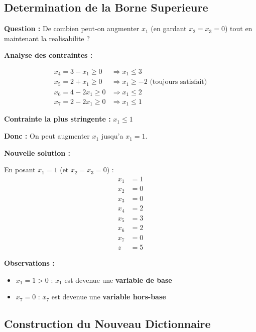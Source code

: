 \documentclass[12pt,a4paper]{article}
\begin{document}
\newpage
\subsection{Determination de la Borne Superieure}

\begin{methode}
\textbf{Question :} De combien peut-on augmenter $x_1$ (en gardant $x_2 = x_3 = 0$) tout en maintenant la realisabilite ?

\textbf{Analyse des contraintes :}

\begin{align*}
x_4 = 3 - x_1 \geq 0 &\Rightarrow x_1 \leq 3\\
x_5 = 2 + x_1 \geq 0 &\Rightarrow x_1 \geq -2 \text{ (toujours satisfait)}\\
x_6 = 4 - 2x_1 \geq 0 &\Rightarrow x_1 \leq 2\\
x_7 = 2 - 2x_1 \geq 0 &\Rightarrow x_1 \leq 1
\end{align*}

\textbf{Contrainte la plus stringente :} $x_1 \leq 1$

\textbf{Donc :} On peut augmenter $x_1$ jusqu'a $x_1 = 1$.
\end{methode}

\begin{important}
\textbf{Nouvelle solution :}

En posant $x_1 = 1$ (et $x_2 = x_3 = 0$) :
\begin{align*}
x_1 &= 1\\
x_2 &= 0\\
x_3 &= 0\\
x_4 &= 2\\
x_5 &= 3\\
x_6 &= 2\\
x_7 &= 0\\
z &= 5
\end{align*}

\textbf{Observations :}
\begin{itemize}
    \item $x_1 = 1 > 0$ : $x_1$ est devenue une \textcolor{titrebleu}{\textbf{variable de base}}
    \item $x_7 = 0$ : $x_7$ est devenue une \textcolor{defvert}{\textbf{variable hors-base}}
\end{itemize}
\end{important}

\newpage
\subsection{Construction du Nouveau Dictionnaire}
\end{document}
